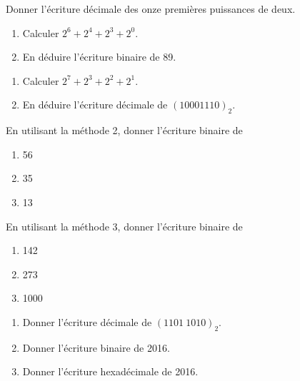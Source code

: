 \documentclass[a4paper,12pt,french]{book}
\begin{document}



\begin{exercice}
Donner l'écriture décimale des onze premières puissances de deux.
\end{exercice}

\begin{exercice}
\begin{enumerate}[\bfseries 1.]
	\item 	Calculer $2^6+2^4+2^3+2^0$.
	\item 	En déduire l'écriture binaire de 89.
\end{enumerate}
\end{exercice}


\begin{exercice}
\begin{enumerate}[\bfseries 1.]
	\item 	Calculer $2^7+2^3+2^2+2^1$.
	\item 	En déduire l'écriture décimale de  $(1000 1110)_2$.
\end{enumerate}
\end{exercice}


\begin{exercice}[]
En utilisant la méthode 2, donner l'écriture binaire de
\begin{enumerate}[\bfseries 1.]
	\item 	56
	\item 	35
	\item 	13
\end{enumerate}
\end{exercice}

\begin{exercice}[]
En utilisant la méthode 3, donner l'écriture binaire de
\begin{enumerate}[\bfseries 1.]
	\item 	142
	\item 	273
	\item 	1000
\end{enumerate}
\end{exercice}

\begin{exercice}
\begin{enumerate}[--]
		\item 	Donner l'écriture décimale de $(1101\ 1010)_2$.
		\item 	Donner l'écriture binaire de 2016.
		\item 	Donner l'écriture hexadécimale de 2016.
\end{enumerate}
\end{exercice}
\end{document}
